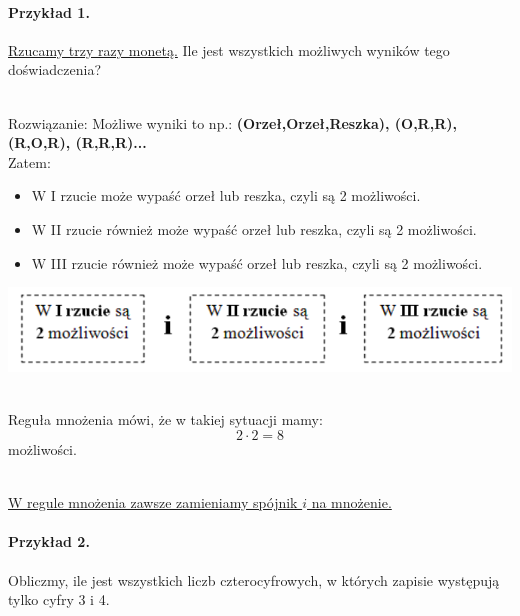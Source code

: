 \documentclass[polish,10pt]{article}
\begin{document}
\paragraph{Przykład 1.}
\underline{Rzucamy trzy razy monetą.} Ile jest wszystkich możliwych wyników tego doświadczenia?

\hspace{1cm}\\Rozwiązanie: 
Możliwe wyniki to np.: \textbf{(Orzeł,Orzeł,Reszka), (O,R,R), (R,O,R), (R,R,R)...}\cite{WK}
\hspace{1cm}\\Zatem: 

\begin{itemize}
\item W I rzucie może wypaść orzeł lub reszka, czyli są 2 możliwości. 
\item W II rzucie również może wypaść orzeł lub reszka, czyli są 2 możliwości.
\item W III rzucie również może wypaść orzeł lub reszka, czyli są 2 możliwości.
\end{itemize}

\includegraphics[width=\textwidth]{images/rzuty.png}

\hspace{1cm}\\Reguła mnożenia mówi, że w takiej sytuacji mamy:  
\begin{equation*}
2\cdot2=8
\end{equation*}
możliwości. 

\hspace{1cm}\\
\underline{W regule mnożenia zawsze zamieniamy spójnik $i$ na mnożenie.}

\paragraph{Przykład 2.}
Obliczmy, ile jest wszystkich liczb czterocyfrowych, w których zapisie występują tylko cyfry 3 i 4.
\end{document}
